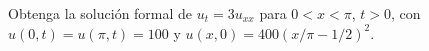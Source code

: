 Obtenga la solución formal de $u_t=3u_{xx}$ para $0<x<\pi$, $t>0$, con $u(0,t)=u(\pi,t)=100$ y $u(x,0)=400(x/\pi-1/2)^2$.

